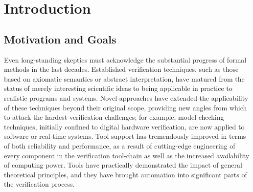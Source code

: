\chapter{Introduction}
\label{sec:intro}



\section{Motivation and Goals}



Even long-standing skeptics must acknowledge the substantial progress of formal methods in the last decades.
Established verification techniques, such as those based on axiomatic semantics or abstract interpretation, have matured from the status of merely interesting scientific ideas to being applicable in practice to realistic programs and systems.
Novel approaches have extended the applicability of these techniques beyond their original scope, providing new angles from which to attack the hardest verification challenges; for example, model checking techniques, initially confined to digital hardware verification, are now applied to software or real-time systems.
Tool support has tremendously improved in terms of both reliability and performance, as a result of cutting-edge engineering of every component in the verification tool-chain as well as the increased availability of computing power.
Tools have practically demonstrated the impact of general theoretical principles, and they have brought automation into significant parts of the verification process.

